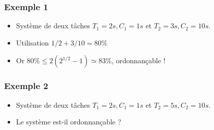 \documentclass[ignorenonframetext,]{beamer}
\begin{document}
\begin{frame}\frametitle{Exemple 1}

\begin{itemize}
\item
  Système de deux tâches $T_1 = 2s, C_1 = 1s$ et $T_2 = 3s , C_2=10s$.
\item
  Utilisation $1/2 + 3/10 = 80 \%$
\item
  Or $80\% \leq 2(2^{1/2} - 1) \simeq 83\%$, ordonnançable !
\end{itemize}

\begin{center}

\begin{RTGrid}[width=6cm]{2}{20}




\end{RTGrid}

\end{center}

\end{frame}

\begin{frame}\frametitle{Exemple 2}

\begin{itemize}
\item
  Système de deux tâches $T_1 = 2s, C_1 = 1s$ et $T_2 = 5s , C_2=10s$.
\item
  Le système est-il ordonnançable ?
\end{itemize}

\end{frame}
\end{document}
